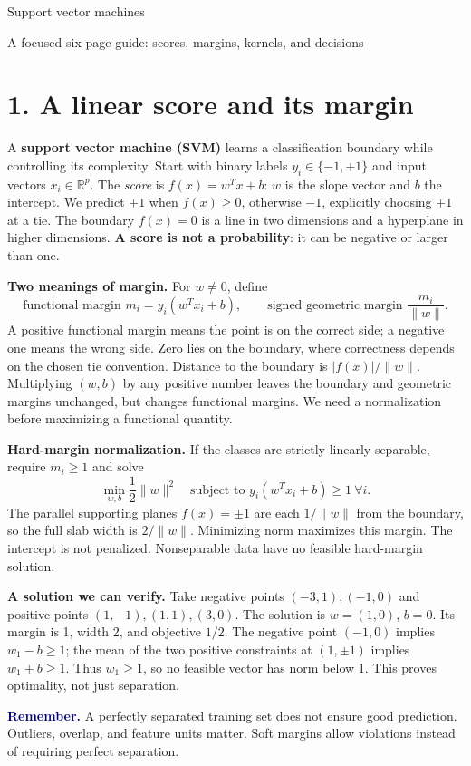 \documentclass[11pt,a4paper]{article}
\newcommand{\idea}[1]{\textcolor{navy}{\textbf{Remember.}} #1}
\begin{document}
{\LARGE\color{navy}Support vector machines}\par
{\large A focused six-page guide: scores, margins, kernels, and decisions}

\section*{1. A linear score and its margin}
A \textbf{support vector machine (SVM)} learns a classification boundary while controlling its complexity.
Start with binary labels $y_i\in\{-1,+1\}$ and input vectors $x_i\in\mathbb R^p$.
The \emph{score} is $f(x)=w^Tx+b$: $w$ is the slope vector and $b$ the intercept.
We predict $+1$ when $f(x)\ge0$, otherwise $-1$, explicitly choosing $+1$ at a tie.
The boundary $f(x)=0$ is a line in two dimensions and a hyperplane in higher dimensions.
\textbf{A score is not a probability}: it can be negative or larger than one.

\textbf{Two meanings of margin.} For $w\ne0$, define
\[
\boxed{\text{functional margin }m_i=y_i(w^Tx_i+b),\qquad
\text{signed geometric margin }\frac{m_i}{\|w\|}.}
\]
A positive functional margin means the point is on the correct side; a negative one means the wrong side.
Zero lies on the boundary, where correctness depends on the chosen tie convention.
Distance to the boundary is $|f(x)|/\|w\|$.
Multiplying $(w,b)$ by any positive number leaves the boundary and geometric margins unchanged,
but changes functional margins. We need a normalization before maximizing a functional quantity.

\textbf{Hard-margin normalization.} If the classes are strictly linearly separable, require $m_i\ge1$ and solve
\[
\boxed{\min_{w,b}\frac12\|w\|^2\quad\text{subject to }y_i(w^Tx_i+b)\ge1\ \forall i.}
\]
The parallel supporting planes $f(x)=\pm1$ are each $1/\|w\|$ from the boundary,
so the full slab width is $2/\|w\|$. Minimizing norm maximizes this margin.
The intercept is not penalized. Nonseparable data have no feasible hard-margin solution.

\textbf{A solution we can verify.} Take negative points $(-3,1),(-1,0)$ and positive points
$(1,-1),(1,1),(3,0)$. The solution is $w=(1,0)$, $b=0$. Its margin is 1, width 2,
and objective $1/2$. The negative point $(-1,0)$ implies $w_1-b\ge1$; the mean of the two
positive constraints at $(1,\pm1)$ implies $w_1+b\ge1$. Thus $w_1\ge1$, so no feasible
vector has norm below 1. This proves optimality, not just separation.

\idea{A perfectly separated training set does not ensure good prediction. Outliers, overlap,
and feature units matter. Soft margins allow violations instead of requiring perfect separation.}
\end{document}
